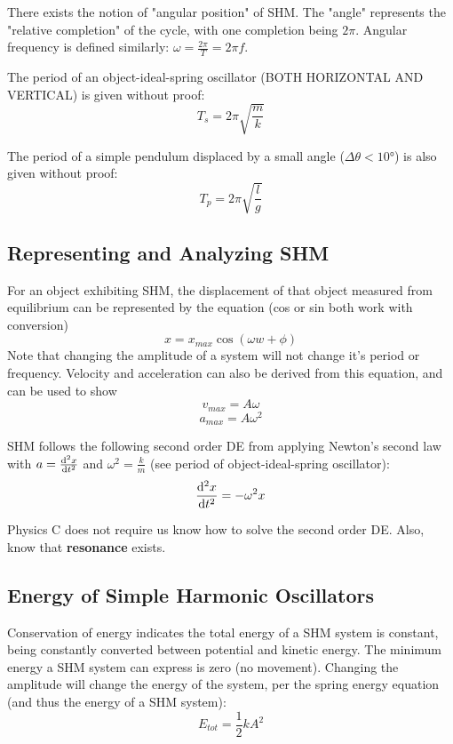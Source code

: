 \documentclass{article}
\begin{document}
There exists the notion of "angular position" of SHM. The "angle" represents the "relative completion" of the cycle, with one completion being $2\pi$.
Angular frequency is defined similarly: $\omega = \frac{2\pi}{T} = 2 \pi f$.

The period of an object-ideal-spring oscillator (BOTH HORIZONTAL AND VERTICAL) is given without proof:
\[T_s = 2 \pi \sqrt{\frac{m}{k}}\]

The period of a simple pendulum displaced by a small angle ($\Delta \theta < \ang{10}$) is also given without proof:
\[T_p = 2 \pi \sqrt{\frac{l}{g}}\]

\subsection{Representing and Analyzing SHM}
For an object exhibiting SHM, the displacement of that object measured from equilibrium can be represented by the equation (cos or sin both work with conversion)
\[x = x_{max} \cos(\omega w + \phi)\]
Note that changing the amplitude of a system will not change it's period or frequency. Velocity and acceleration can also be derived from this equation, and can be used to show
\[v_{max} = A\omega\]
\[a_{max} = A\omega^2\]

SHM follows the following second order DE from applying Newton's second law with $a = \odv[2]{x}{t}$ and $\omega^2 = \frac{k}{m}$ (see period of object-ideal-spring oscillator):
\[\odv[2]{x}{t} = -\omega^2 x\]

Physics C does not require us know how to solve the second order DE. Also, know that \textbf{resonance} exists.

\subsection{Energy of Simple Harmonic Oscillators}
Conservation of energy indicates the total energy of a SHM system is constant, being constantly converted between potential and kinetic energy.
The minimum energy a SHM system can express is zero (no movement).
Changing the amplitude will change the energy of the system, per the spring energy equation (and thus the energy of a SHM system):
\[E_{tot} = \frac{1}{2} kA^2\]
\end{document}
